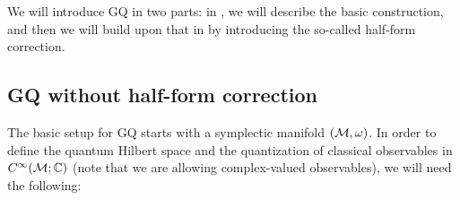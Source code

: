 \documentclass[notas.tex]{subfiles}
\begin{document}
We will introduce GQ in two parts: in , we will describe the basic construction, and then we will build upon that in  by introducing the so-called half-form correction. \\

\subsection{GQ without half-form correction} \label{sec_gq_without_hf}

The basic setup for GQ starts with a symplectic manifold $(\mathcal{M}, \omega)$. In order to define the quantum Hilbert space and the quantization of classical observables in $C^\infty(\mathcal{M}; \mathbb{C})$ (note that we are allowing complex-valued observables), we will need the following:
\end{document}
